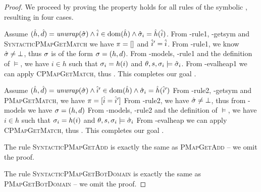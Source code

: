 \begin{proof}
We proceed by proving the property holds for all rules of the symbolic , resulting in four cases.


\begin{hypvlist}
 Assume $(\hat{h}, \hat{d})={\operatorname{\mathit{unwrap}}}(\hat{\sigma}) \land \hat{i}\in\operatorname{dom}(\hat{h}) \land \hat{\sigma}_i=\hat{h}(\hat{i})$.
 From \hyp{rule1}, \hyp{getsym} and \textsc{SyntacticPMapGetMatch} we have $\pi=[]$ and $\hat{i}'=\hat{i}$.
 From \hyp{rule1}, we know $\hat{\sigma}\neq\bot$, thus $\sigma$ is of the form $\sigma=(h,d)$.
 From \hyp{models}, \hyp{rule1} and the definition of $\models$, we have $i\in h$ such that $\sigma_i=h(i)$ and ${\theta,s,\sigma_i\models\hat{\sigma}_i}$.
 From \hyp{evalheap1} we can apply \textsc{CPMapGetMatch}, thus . This completes our goal .
\end{hypvlist}


\begin{hypvlist}
 Assume $(\hat{h},\hat{d})={\operatorname{\mathit{unwrap}}}(\hat{\sigma}) \land \hat{i}'\in\operatorname{dom}(\hat{h}) \land \hat{\sigma}_i=\hat{h}(\hat{i}')$
 From \hyp{rule2}, \hyp{getsym} and \textsc{PMapGetMatch}, we have $\pi=[\hat{i}=\hat{i}']$
 From \hyp{rule2}, we have $\hat{\sigma}\neq\bot$, thus from \hyp{models} we have $\sigma=(h, d)$
 From \hyp{models}, \hyp{rule2} and the definition of $\models$, we have $i\in h$ such that $\sigma_i=h(i)$ and ${\theta,s,\sigma_i\models\hat{\sigma}_i}$
 From \hyp{evalheap} we can apply \textsc{CPMapGetMatch}, thus . This completes our goal .
\end{hypvlist}

The rule \textsc{SyntacticPMapGetAdd} is exactly the same as \textsc{PMapGetAdd} -- we omit the proof.

The rule \textsc{SyntacticPMapGetBotDomain} is exactly the same as \textsc{PMapGetBotDomain} -- we omit the proof.
\end{proof}
